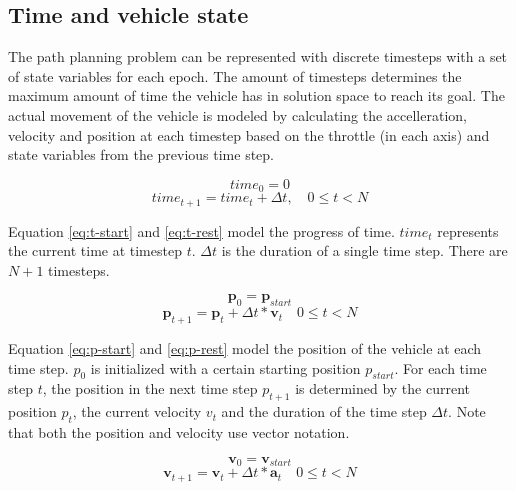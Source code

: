 \subsection{Time and vehicle state}
\label{section:modeling}

The path planning problem can be represented with discrete timesteps with a set of state variables for each epoch. The amount of timesteps determines the maximum amount of time the vehicle has in solution space to reach its goal. The actual movement of the vehicle is modeled by calculating the accelleration, velocity and position at each timestep based on the throttle (in each axis) and state variables from the previous time step.

\begin{equation}
\label{eq:t-start}
time_0 = 0
\end{equation}
\begin{equation}
\label{eq:t-rest}
time_{t+1} = time_{t} + \Delta t,  \quad 0 \leq t < N
\end{equation}

Equation \ref{eq:t-start} and \ref{eq:t-rest} model the progress of time. $time_t$ represents the current time at timestep $t$. $\Delta t$ is the duration of a single time step. There are $N + 1$ timesteps.


\begin{equation}
\label{eq:p-start}
\boldsymbol{p}_0 = \boldsymbol{p}_{start}
\end{equation}
\begin{equation}
\label{eq:p-rest}
\boldsymbol{p}_{t+1} = \boldsymbol{p}_{t} + \Delta t * \boldsymbol{v}_{t}  \quad 0 \leq t < N
\end{equation}

Equation \ref{eq:p-start} and \ref{eq:p-rest} model the position of the vehicle at each time step. $p_0$ is initialized with a certain starting position $p_{start}$. For each time step $t$, the position in the next time step $p_{t+1}$ is determined by the current position $p_t$, the current velocity $v_t$ and the duration of the time step $\Delta t$. Note that both the position and velocity use vector notation.

\begin{equation}
\label{eq:v-start}
\boldsymbol{v}_0 =\boldsymbol{v}_{start}
\end{equation}
\begin{equation}
\label{eq:v-rest}
\boldsymbol{v}_{t+1} =\boldsymbol{v}_{t} + \Delta t * \boldsymbol{a}_{t}  \quad 0 \leq t < N
\end{equation}


